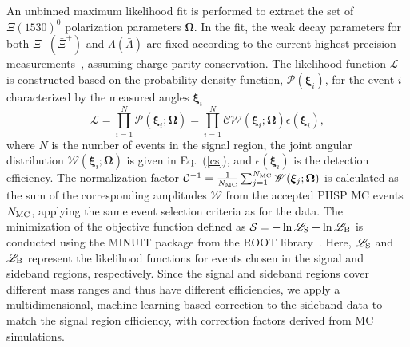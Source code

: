 \documentclass[prd,aps,reprint,noeprint,superscriptaddress,amsmath, amssymb]{revtex4-1}
\newcommand{\Xs}{\Xi(1530)^0}
\begin{document}
An unbinned maximum likelihood fit is performed to extract the set of $\Xs$ polarization parameters $\bm{\Omega}$. In the fit, the weak decay parameters for both $\Xi^-(\bar\Xi^+)$ and $\Lambda(\bar\Lambda)$ are fixed according to the current highest-precision measurements~\cite{BESIII:2021ypr,BESIII:2022qax}, assuming charge-parity conservation. The likelihood function $\mathscr{L}$ is constructed based on the probability density function, $\mathscr{P}(\bm{\xi}_i)$, for the event $i$ characterized by the measured angles $\bm{\xi}_i$
\begin{equation}
    \mathscr{L}=\prod_{i=1}^{N}\mathscr{P}(\bm{\xi}_i;\bm{\Omega})=\prod_{i=1}^{N}\mathcal{C}\mathscr{W}(\bm{\xi}_i;\bm{\Omega})\epsilon(\bm{\xi}_i),
\end{equation}
where $N$ is the number of events in the signal region, the joint angular distribution $\mathscr{W}(\bm{\xi}_i;\bm{\Omega})$ is given in Eq.~(\ref{cs}), and $\epsilon(\bm{\xi}_i)$ is the detection efficiency.
The normalization factor $\mathcal{C}^{-1}=\frac{1}{N_{\rm MC}}\sum_{j=1}^{N_{\rm MC}}\mathscr{W}(\bm{\xi}_j;\bm{\Omega})$ is calculated as the sum of the corresponding amplitudes $\mathscr{W}$ from the accepted PHSP MC events $N_{\rm MC}$, applying the same event selection criteria as for the data.
The minimization of the objective function defined as $\mathcal{S} = -\ln\mathscr{L}_{\rm S} + \ln\mathscr{L}_{\rm B}$ is conducted using the MINUIT package from the ROOT library~\cite{James:1975dr}.
Here, $\mathscr{L}_{\rm S}$ and $\mathscr{L}_{\rm B}$ represent the likelihood functions for events chosen in the signal and sideband regions, respectively.
Since the signal and sideband regions cover different mass ranges and thus have different efficiencies, we apply a multidimensional, machine-learning-based correction to the sideband data to match the signal region efficiency, with correction factors derived from MC simulations.
\end{document}

